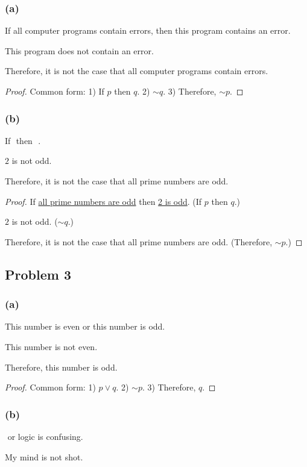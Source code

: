 \documentclass[14pt]{extarticle}
\newcommand{\fbl}{\underline{\hspace{1cm}}\,\,}
\begin{document}
\subsubsection{(a)}
If all computer programs contain errors, then this program contains an error.

This program does not contain an error.

Therefore, it is not the case that all computer programs contain errors.

\begin{proof}
Common form: 1) If $p$ then $q$. 2) $\sim q$. 3) Therefore, $\sim p$.
\end{proof}

\subsubsection{(b)}
If \fbl then \fbl.

$2$ is not odd.

Therefore, it is not the case that all prime numbers are odd.

\begin{proof}
If \underline{all prime numbers are odd} then \underline{2 is odd}. (If $p$ then $q$.)

$2$ is not odd. ($\sim q$.)

Therefore, it is not the case that all prime numbers are odd.
(Therefore, $\sim p$.)
\end{proof}

\subsection{Problem 3}
\subsubsection{(a)}
This number is even or this number is odd.

This number is not even.

Therefore, this number is odd.

\begin{proof}
Common form: 1) $p \vee q$. 2) $\sim p$. 3) Therefore, $q$.
\end{proof}

\subsubsection{(b)}
\fbl or logic is confusing.

My mind is not shot.
\end{document}
